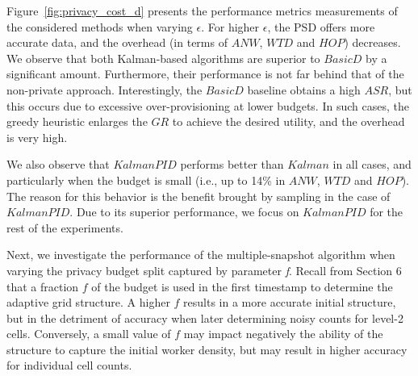 \documentclass{USC-Thesis}
\numberwithin{equation}{chapter}
\begin{document}
Figure~\ref{fig:privacy_cost_d} presents the performance metrics measurements of the considered methods when varying $\epsilon$. For higher $\epsilon$, the PSD offers more accurate data, and the overhead (in terms of $ANW$, $\mathit{WTD}$ and $\mathit{HOP}$) decreases. We observe that both Kalman-based algorithms are superior to $\mathit{BasicD}$ by a significant amount. Furthermore, their performance is not far behind that of the non-private approach. Interestingly, the $\mathit{BasicD}$ baseline obtains a high $\mathit{ASR}$, but this occurs due to excessive over-provisioning at lower budgets. In such cases, the greedy heuristic enlarges the $\mathit{GR}$ to achieve the desired utility, and the overhead is very high.

We also observe that $\mathit{KalmanPID}$ performs better than $\mathit{Kalman}$ in all cases, and particularly when the budget is small (i.e., up to 14\% in $ANW$, $\mathit{WTD}$ and $\mathit{HOP}$). 
The reason for this behavior is the benefit brought by sampling in the case of $\mathit{KalmanPID}$. 
Due to its superior performance, we focus on $\mathit{KalmanPID}$ for the rest of the experiments.


Next, we investigate the performance of the multiple-snapshot algorithm when varying the privacy budget split captured by parameter {\em f}. Recall from Section 6 that a fraction $f$ of the budget is used in the first timestamp to determine the adaptive grid structure. A higher $f$ results in a more accurate initial structure, but in the detriment of accuracy when later determining noisy counts for level-2 cells. Conversely, a small value of $f$ may impact negatively the ability of the structure to capture the initial worker density, but may result in higher accuracy for individual cell counts.
\end{document}
